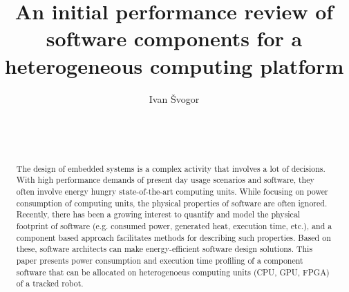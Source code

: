 \documentclass{sig-alternate}
\begin{document}


\title{An initial performance review of software components for a heterogeneous computing platform}
% 
%
%
%

%
\author{
%
%
\alignauthor
Ivan \v{S}vogor\\
       \\
       \\
       \\
}



\maketitle

\begin{abstract}

The design of embedded systems is a complex activity that involves a lot of decisions. With high performance demands of present day usage scenarios and software, they often involve energy hungry state-of-the-art computing units. While focusing on power consumption of computing units, the physical properties of software are often ignored. Recently, there has been a growing interest to quantify and model the physical footprint of software (e.g. consumed power, generated heat, execution time, etc.), and a component based approach facilitates methods for describing such properties. Based on these, software architects can make energy-efficient software design solutions. This paper presents power consumption and execution time profiling of a component software that can be allocated on heterogenoeus computing units (CPU, GPU, FPGA) of a tracked robot.

\end{abstract}
\end{document}
